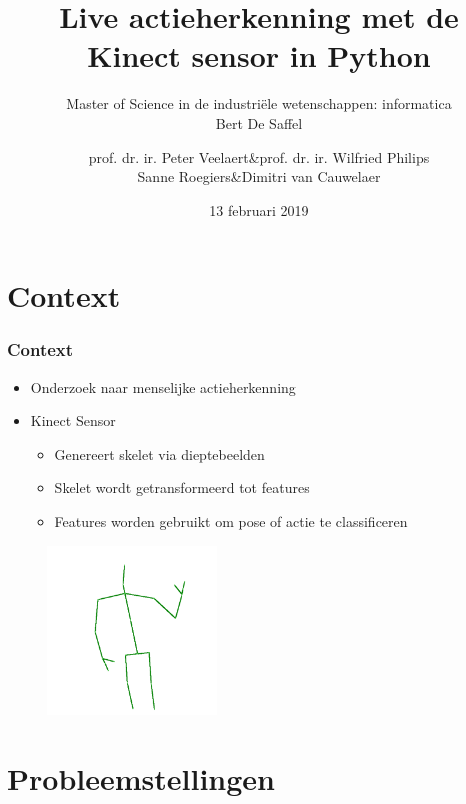 \documentclass[handout]{beamer}
\begin{document}
	\title[Actieherkenning met de Kinect sensor]{Live actieherkenning met de Kinect sensor in Python}
	\author[Bert De Saffel]{
				\begin{tabular}{rcr}
				prof. dr. ir. Peter Veelaert &\&& prof. dr. ir. Wilfried Philips \\
				Sanne Roegiers &\&& Dimitri van Cauwelaer
				\end{tabular}
	}
	
	\subtitle{Master of Science in de industriële wetenschappen: informatica \\ \vspace{0.2cm} Bert De Saffel}
	\date{13 februari 2019}
	\frame{\titlepage}
	
	\section{Context}
	
	\begin{frame}
	\frametitle{Context}
		\begin{itemize}
			\item<1- > Onderzoek naar menselijke actieherkenning
			\item<2- > Kinect Sensor 
			\begin{itemize}
				\item<3- > Genereert skelet via dieptebeelden
				\item<4- > Skelet wordt getransformeerd tot features
				\item<5- > Features worden gebruikt om pose of actie te classificeren
			\end{itemize}
		\end{itemize}
		\begin{figure}
			\includegraphics[width=0.4\textwidth]{skeleton}
		\end{figure}
	\end{frame}

	
	\section{Probleemstellingen}
\end{document}
